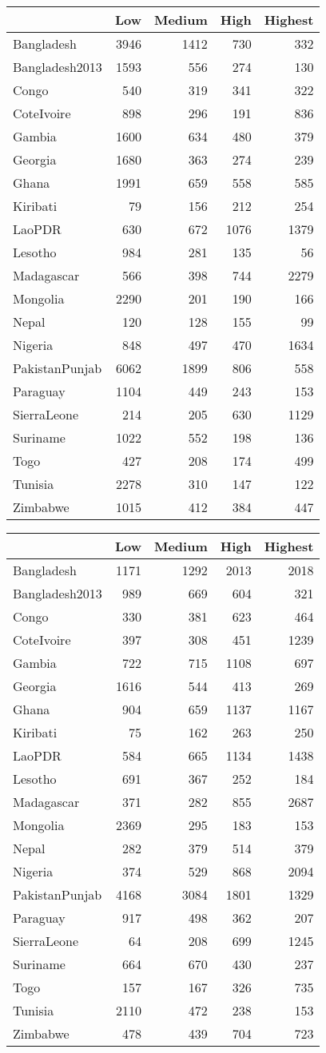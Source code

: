 \documentclass[
]{article}
\newenvironment{Shaded}{\begin{snugshade}}{\end{snugshade}}
\newcommand{\CommentTok}[1]{\textcolor[rgb]{0.56,0.35,0.01}{\textit{#1}}}
\newcommand{\DataTypeTok}[1]{\textcolor[rgb]{0.13,0.29,0.53}{#1}}
\newcommand{\DecValTok}[1]{\textcolor[rgb]{0.00,0.00,0.81}{#1}}
\newcommand{\KeywordTok}[1]{\textcolor[rgb]{0.13,0.29,0.53}{\textbf{#1}}}
\newcommand{\NormalTok}[1]{#1}
\newcommand{\OperatorTok}[1]{\textcolor[rgb]{0.81,0.36,0.00}{\textbf{#1}}}
\newcommand{\StringTok}[1]{\textcolor[rgb]{0.31,0.60,0.02}{#1}}
\begin{document}
\begin{longtable}[]{@{}lrrrr@{}}
\toprule
& Low & Medium & High & Highest\tabularnewline
\midrule
\endhead
Bangladesh & 3946 & 1412 & 730 & 332\tabularnewline
Bangladesh2013 & 1593 & 556 & 274 & 130\tabularnewline
Congo & 540 & 319 & 341 & 322\tabularnewline
CoteIvoire & 898 & 296 & 191 & 836\tabularnewline
Gambia & 1600 & 634 & 480 & 379\tabularnewline
Georgia & 1680 & 363 & 274 & 239\tabularnewline
Ghana & 1991 & 659 & 558 & 585\tabularnewline
Kiribati & 79 & 156 & 212 & 254\tabularnewline
LaoPDR & 630 & 672 & 1076 & 1379\tabularnewline
Lesotho & 984 & 281 & 135 & 56\tabularnewline
Madagascar & 566 & 398 & 744 & 2279\tabularnewline
Mongolia & 2290 & 201 & 190 & 166\tabularnewline
Nepal & 120 & 128 & 155 & 99\tabularnewline
Nigeria & 848 & 497 & 470 & 1634\tabularnewline
PakistanPunjab & 6062 & 1899 & 806 & 558\tabularnewline
Paraguay & 1104 & 449 & 243 & 153\tabularnewline
SierraLeone & 214 & 205 & 630 & 1129\tabularnewline
Suriname & 1022 & 552 & 198 & 136\tabularnewline
Togo & 427 & 208 & 174 & 499\tabularnewline
Tunisia & 2278 & 310 & 147 & 122\tabularnewline
Zimbabwe & 1015 & 412 & 384 & 447\tabularnewline
\bottomrule
\end{longtable}

\begin{Shaded}
\end{Shaded}

\begin{longtable}[]{@{}lrrrr@{}}
\toprule
& Low & Medium & High & Highest\tabularnewline
\midrule
\endhead
Bangladesh & 1171 & 1292 & 2013 & 2018\tabularnewline
Bangladesh2013 & 989 & 669 & 604 & 321\tabularnewline
Congo & 330 & 381 & 623 & 464\tabularnewline
CoteIvoire & 397 & 308 & 451 & 1239\tabularnewline
Gambia & 722 & 715 & 1108 & 697\tabularnewline
Georgia & 1616 & 544 & 413 & 269\tabularnewline
Ghana & 904 & 659 & 1137 & 1167\tabularnewline
Kiribati & 75 & 162 & 263 & 250\tabularnewline
LaoPDR & 584 & 665 & 1134 & 1438\tabularnewline
Lesotho & 691 & 367 & 252 & 184\tabularnewline
Madagascar & 371 & 282 & 855 & 2687\tabularnewline
Mongolia & 2369 & 295 & 183 & 153\tabularnewline
Nepal & 282 & 379 & 514 & 379\tabularnewline
Nigeria & 374 & 529 & 868 & 2094\tabularnewline
PakistanPunjab & 4168 & 3084 & 1801 & 1329\tabularnewline
Paraguay & 917 & 498 & 362 & 207\tabularnewline
SierraLeone & 64 & 208 & 699 & 1245\tabularnewline
Suriname & 664 & 670 & 430 & 237\tabularnewline
Togo & 157 & 167 & 326 & 735\tabularnewline
Tunisia & 2110 & 472 & 238 & 153\tabularnewline
Zimbabwe & 478 & 439 & 704 & 723\tabularnewline
\bottomrule
\end{longtable}
\end{document}
